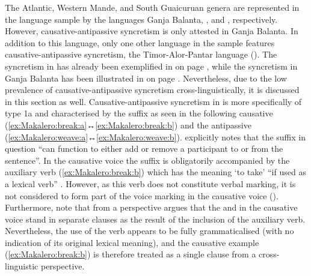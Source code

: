 The Atlantic, Western Mande, and South Guaicuruan genera are represented in the language sample by the languages Ganja Balanta, , and , respectively. However, causative-antipassive syncretism is only attested in Ganja Balanta. In addition to this language, only one other language in the sample features causative-antipassive syncretism, the Timor-Alor-Pantar language  (). The syncretism in  has already been exemplified in  on page \pageref{tab:ch3:type1a-examples-1}, while the syncretism in Ganja Balanta has been illustrated in  on page \pageref{tab:ch3:type1b-examples-2}. Nevertheless, due to the low prevalence of causative-antipassive syncretism cross-linguistically, it is discussed in this section as well. Causative-antipassive syncretism in  is more specifically of type 1a and characterised by the suffix  as seen in the following causative  (\ref{ex:Makalero:break:a}↔\ref{ex:Makalero:break:b}) and the antipassive  (\ref{ex:Makalero:weave:a}↔\ref{ex:Makalero:weave:b}). \citet[340]{huber:2011} explicitly notes that the suffix in question “can function to either add or remove a participant to or from the sentence”. In the causative voice the suffix is obligatorily accompanied by the auxiliary verb  (\ref{ex:Makalero:break:b}) which has the meaning ‘to take’ “if used as a lexical verb” \citep[203]{huber:2011}. However, as this verb does not constitute verbal marking, it is not considered to form part of the voice marking in the causative voice (). Furthermore, note that from a  perspective \citet[340]{huber:2011} argues that the  and  in the causative voice stand in separate clauses as the result of the inclusion of the auxiliary verb. Nevertheless, the use of the verb appears to be fully grammaticalised (with no indication of its original lexical meaning), and the causative example (\ref{ex:Makalero:break:b}) is therefore treated as a single clause from a cross-linguistic perspective. 

